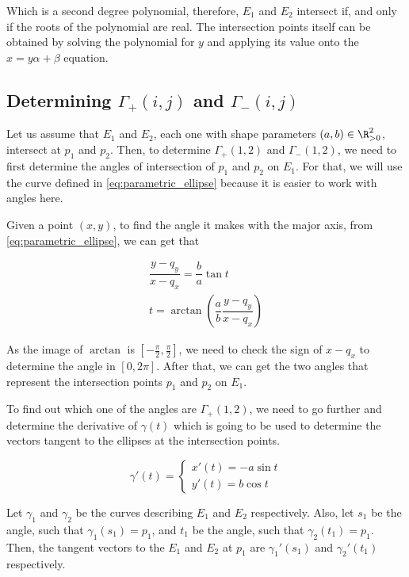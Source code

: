 Which is a second degree polynomial, therefore, $E_1$ and $E_2$ intersect if, and only if the roots of the polynomial are real. The intersection points itself can be obtained by solving the polynomial for $y$ and applying its value onto the $x=y\alpha + \beta$ equation.

\subsection{Determining $\Gamma_+(i,j)$ and $\Gamma_-(i,j)$}

Let us assume that $E_1$ and $E_2$, each one with shape parameters $(a,b) \in \R^2_{>0}$, intersect at $p_1$ and $p_2$. Then, to determine $\Gamma_+(1,2)$ and $\Gamma_-(1,2)$, we need to first determine the angles of intersection of $p_1$ and $p_2$ on $E_1$. For that, we will use the curve defined in \autoref{eq:parametric_ellipse} because it is easier to work with angles here.

Given a point $(x,y)$, to find the angle it makes with the major axis, from \autoref{eq:parametric_ellipse}, we can get that

\begin{align*}
\dfrac{y-q_y}{x-q_x} = \dfrac{b}{a}\tan{t}\\
t=\arctan\left(\dfrac{a}{b} \dfrac{y-q_y}{x-q_x}\right)
\end{align*}

As the image of $\arctan$ is $[-\frac{\pi}{2}, \frac{\pi}{2}]$, we need to check the sign of $x-q_x$ to determine the angle in $[0, 2\pi]$. After that, we can get the two angles that represent the intersection points $p_1$ and $p_2$ on $E_1$.

To find out which one of the angles are $\Gamma_+(1,2)$, we need to go further and determine the derivative of $\gamma(t)$ which is going to be used to determine the vectors tangent to the ellipses at the intersection points.

\begin{equation}
\gamma'(t) = \left\{
\begin{array}{l}
x'(t)= -a\sin{t}\\
y'(t)=b\cos{t}
\end{array}
\right.
\end{equation}

Let $\gamma_1$ and $\gamma_2$ be the curves describing $E_1$ and $E_2$ respectively. Also, let $s_1$ be the angle, such that $\gamma_1(s_1)=p_1$, and $t_1$ be the angle, such that $\gamma_2(t_1)=p_1$.
Then, the tangent vectors to the $E_1$ and $E_2$ at $p_1$ are $\gamma_1'(s_1)$ and $\gamma_2'(t_1)$ respectively.

